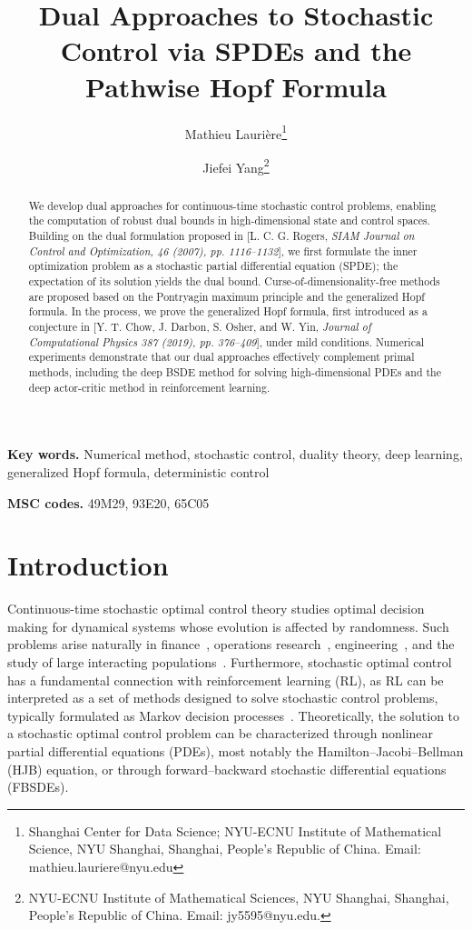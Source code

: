 \documentclass[11pt]{article}
\title{Dual Approaches to Stochastic Control via SPDEs and the Pathwise Hopf Formula}
\author{Mathieu Lauri\`{e}re\thanks{Shanghai Center for Data Science; NYU-ECNU Institute of Mathematical Science, NYU Shanghai, Shanghai, People’s Republic of China. Email: mathieu.lauriere@nyu.edu}
\and Jiefei Yang\thanks{NYU-ECNU Institute of Mathematical Sciences, NYU Shanghai, Shanghai, People’s Republic of China. Email: jy5595@nyu.edu.}
}
\date{}
\numberwithin{equation}{section}
\theoremstyle{plain}
\theoremstyle{definition}
\theoremstyle{remark}
\begin{document}
\maketitle

\begin{abstract}
We develop dual approaches for continuous-time stochastic control problems, enabling the computation of robust dual bounds in high-dimensional state and control spaces. Building on the dual formulation proposed in [L. C. G. Rogers, \textit{SIAM Journal on Control and Optimization, 46 (2007), pp. 1116--1132}], we first formulate the inner optimization problem as a stochastic partial differential equation (SPDE); the expectation of its solution yields the dual bound. Curse-of-dimensionality-free methods are proposed based on the Pontryagin maximum principle and the generalized Hopf formula. In the process, we prove the generalized Hopf formula, first introduced as a conjecture in [Y. T. Chow, J. Darbon, S. Osher, and W. Yin, \textit{Journal of Computational Physics 387 (2019), pp. 376--409}], under mild conditions. Numerical experiments demonstrate that our dual approaches effectively complement primal methods, including the deep BSDE method for solving high-dimensional PDEs and the deep actor-critic method in reinforcement learning. 
\end{abstract}

{\bf Key words.} Numerical method, stochastic control, duality theory,  deep learning, generalized Hopf formula, deterministic control

{\bf MSC codes.} 49M29, 93E20, 65C05

\section{Introduction}

Continuous-time stochastic optimal control theory studies optimal decision making for dynamical systems whose evolution is affected by randomness. Such problems arise naturally in finance~\cite{pham2009continuous}, operations research~\cite{heyman2004stochastic}, engineering~\cite{athans1971role}, and the study of large interacting populations~\cite{carmona2018probabilistic}. Furthermore, stochastic optimal control has a fundamental connection with reinforcement learning (RL), as RL can be interpreted as a set of methods designed to solve stochastic control problems, typically formulated as Markov decision processes~\cite{recht2019tour}. Theoretically, the solution to a stochastic optimal control problem can be characterized through nonlinear partial differential equations (PDEs), most notably the Hamilton--Jacobi--Bellman (HJB) equation, or through forward--backward stochastic differential equations (FBSDEs). 
\end{document}

